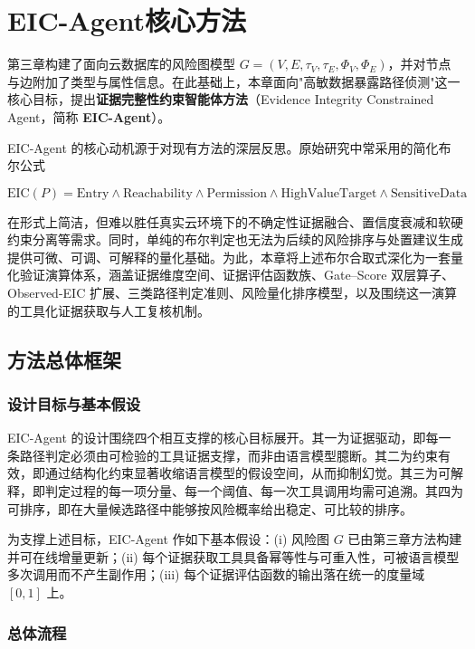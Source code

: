 \documentclass[a4paper,12pt]{ctexart}
\begin{document}
\section{EIC-Agent核心方法}

第三章构建了面向云数据库的风险图模型 $G=(V,E,\tau_V,\tau_E,\Phi_V,\Phi_E)$，并对节点与边附加了类型与属性信息。在此基础上，本章面向"高敏数据暴露路径侦测"这一核心目标，提出\textbf{证据完整性约束智能体方法}（Evidence Integrity Constrained Agent，简称 \textbf{EIC-Agent}）。

EIC-Agent 的核心动机源于对现有方法的深层反思。原始研究中常采用的简化布尔公式

\[
\text{EIC}(P) = \text{Entry} \wedge \text{Reachability} \wedge \text{Permission} \wedge \text{HighValueTarget} \wedge \text{SensitiveData}
\]

在形式上简洁，但难以胜任真实云环境下的不确定性证据融合、置信度衰减和软硬约束分离等需求。同时，单纯的布尔判定也无法为后续的风险排序与处置建议生成提供可微、可调、可解释的量化基础。为此，本章将上述布尔合取式深化为一套量化验证演算体系，涵盖证据维度空间、证据评估函数族、Gate–Score 双层算子、Observed-EIC 扩展、三类路径判定准则、风险量化排序模型，以及围绕这一演算的工具化证据获取与人工复核机制。

\subsection{方法总体框架}

\subsubsection{设计目标与基本假设}

EIC-Agent 的设计围绕四个相互支撑的核心目标展开。其一为证据驱动，即每一条路径判定必须由可检验的工具证据支撑，而非由语言模型臆断。其二为约束有效，即通过结构化约束显著收缩语言模型的假设空间，从而抑制幻觉。其三为可解释，即判定过程的每一项分量、每一个阈值、每一次工具调用均需可追溯。其四为可排序，即在大量候选路径中能够按风险概率给出稳定、可比较的排序。

为支撑上述目标，EIC-Agent 作如下基本假设：(i) 风险图 $G$ 已由第三章方法构建并可在线增量更新；(ii) 每个证据获取工具具备幂等性与可重入性，可被语言模型多次调用而不产生副作用；(iii) 每个证据评估函数的输出落在统一的度量域 $[0,1]$ 上。

\subsubsection{总体流程}
\end{document}
